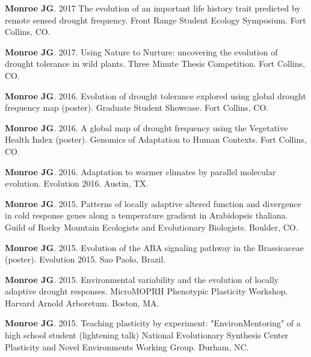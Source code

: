 \documentclass[12pt,english]{article}
\begin{document}
\begin{hangparas}{.5in}{1}

\hspace{1em}\textbf{Monroe JG}. 2017 The evolution of an important life history trait predicted by remote sensed drought frequency. Front Range Student Ecology Symposium. Fort Collins, CO.
\vspace{0.5ex}\par
\hspace{1em}\textbf{Monroe JG}. 2017. Using Nature to Nurture: uncovering the evolution of drought tolerance in wild plants. Three Minute Thesis Competition. Fort Collins, CO.
\vspace{0.5ex}\par
\hspace{1em}\textbf{Monroe JG}. 2016. Evolution of drought tolerance explored using global drought frequency map (poster). Graduate Student Showcase. Fort Collins, CO.
\vspace{0.5ex}\par
\hspace{1em}\textbf{Monroe JG}. 2016. A global map of drought frequency using the Vegetative Health Index (poster). Genomics of Adaptation to Human Contexts. Fort Collins, CO.
\vspace{0.5ex}\par
\hspace{1em}\textbf{Monroe JG}. 2016. Adaptation to warmer climates by parallel molecular evolution. Evolution 2016. Austin, TX.
\vspace{0.5ex}\par
\hspace{1em}\textbf{Monroe JG}. 2015. Patterns of locally adaptive altered function and divergence in cold response genes along a temperature gradient in Arabidopsis thaliana. Guild of Rocky Mountain Ecologists and Evolutionary Biologists. Boulder, CO.
\vspace{0.5ex}\par
\hspace{1em}\textbf{Monroe JG}. 2015. Evolution of the ABA signaling pathway in the Brassicaceae (poster). Evolution 2015. Sao Paolo, Brazil.
\vspace{0.5ex}\par
\hspace{1em}\textbf{Monroe JG}. 2015. Environmental variability and the evolution of locally adaptive drought responses. MicroMOPRH Phenotypic Plasticity Workshop. Harvard Arnold Arboretum. Boston, MA.
\vspace{0.5ex}\par
\hspace{1em}\textbf{Monroe JG}. 2015. Teaching plasticity by experiment: "EnvironMentoring" of a high school student (lightening talk) National Evolutionary Synthesis Center Plasticity and Novel Environments Working Group. Durham, NC.
\vspace{0.5ex}\par
\end{hangparas}
\end{document}
